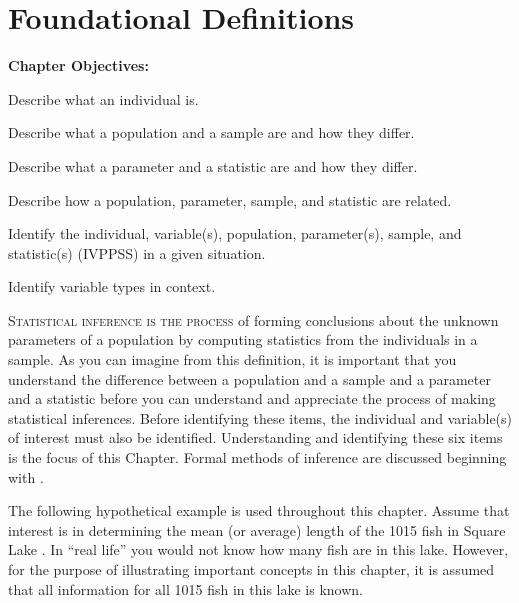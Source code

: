 \documentclass[10pt,openany]{book}\usepackage[]{graphicx}\usepackage[]{color}
\begin{document}
\chapter{Foundational Definitions} \label{chap:FoundationalDefinitions}
\begin{ChapObj}{\boxwidth}
  \textbf{Chapter Objectives:}
  \begin{Enumerate}
    \item Describe what an individual is.
    \item Describe what a population and a sample are and how they differ.
    \item Describe what a parameter and a statistic are and how they differ.
    \item Describe how a population, parameter, sample, and statistic are related.
    \item Identify the individual, variable(s), population, parameter(s), sample, and statistic(s) (IVPPSS) in a given situation.
    \item Identify variable types in context.
  \end{Enumerate}
\end{ChapObj}

\minitoc
\newpage

\lettrine{S}{tatistical inference is the process} of forming conclusions about the unknown parameters of a population by computing statistics from the individuals in a sample.  As you can imagine from this definition, it is important that you understand the difference between a population and a sample and a parameter and a statistic before you can understand and appreciate the process of making statistical inferences.  Before identifying these items, the individual and variable(s) of interest must also be identified.  Understanding and identifying these six items is the focus of this Chapter.  Formal methods of inference are discussed beginning with .


The following hypothetical example is used throughout this chapter.  Assume that interest is in determining the mean (or average) length of the 1015 fish in Square Lake . In ``real life'' you would not know how many fish are in this lake.  However, for the purpose of illustrating important concepts in this chapter, it is assumed that all information for all 1015 fish in this lake is known.
\end{document}
